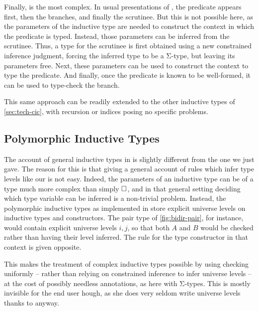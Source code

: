 Finally,  is the most complex.
In usual presentations of , the predicate appears first, then the branches,
and finally the scrutinee. But this is not possible here, as the parameters of the inductive
type are needed to construct the context in which the predicate is typed.
Instead, those parameters can be inferred from the scrutinee.
Thus, a type for the scrutinee is first obtained using a new constrained inference judgment,
forcing the inferred type to be a Σ-type, but leaving its parameters free.
Next, these parameters can be used to construct the context to type the predicate.
And finally, once the predicate is known to be well-formed,
it can be used to type-check the branch.

This same approach can be readily extended to the other inductive types of
\cref{sec:tech-cic}, with recursion or indices posing no specific problems.

\subsection{Polymorphic Inductive Types}

The account of general inductive types in  is slightly different from
the one we just gave. The reason for this is that giving a general account of rules
which infer type levels like our  is not easy.
Indeed, the parameters of an inductive type can
be of a type much more complex than simply $\uni$, and in that general setting deciding which
type variable can be inferred is a non-trivial problem.
Instead, the polymorphic inductive types as implemented in  store explicit universe
levels on inductive types and constructors. The  pair type of \cref{fig:bidir-pair},
for instance, would contain explicit universe levels $i,j$, so that both $A$ and $B$
would be checked rather than having their level inferred.
The rule for the type constructor in that context is given opposite.
\begin{marginfigure}
    {}
\end{marginfigure}
This makes the treatment of complex inductive types possible by using checking uniformly –
rather than relying on constrained inference to infer universe levels –
at the cost of possibly needless annotations, as here with Σ-types.
This is mostly invisible for the end user hough, as she does very seldom write universe
levels thanks to  anyway.

